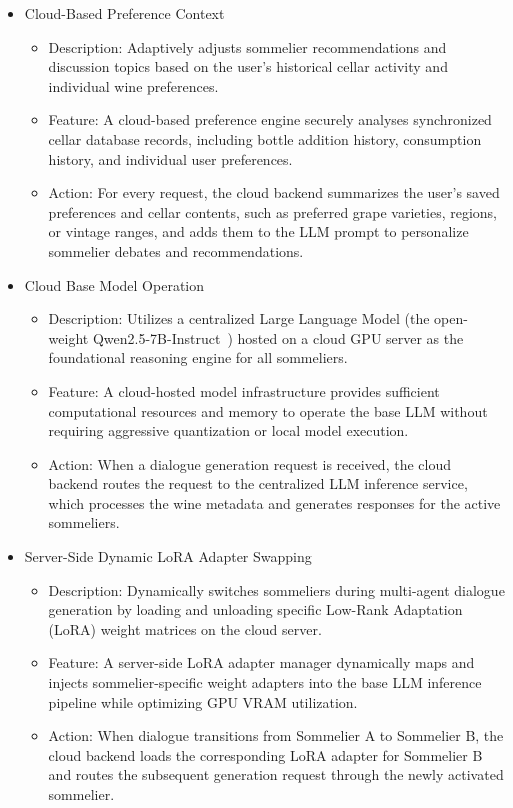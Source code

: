 \documentclass[conference]{IEEEtran}
\begin{document}
\begin{itemize}
    \item Cloud-Based Preference Context
    \begin{itemize}
        \item Description: Adaptively adjusts sommelier recommendations and discussion topics based on the user's historical cellar activity and individual wine preferences.
        \item Feature: A cloud-based preference engine securely analyses synchronized cellar database records, including bottle addition history, consumption history, and individual user preferences.
        \item Action: For every request, the cloud backend summarizes the user's saved preferences and cellar contents, such as preferred grape varieties, regions, or vintage ranges, and adds them to the LLM prompt to personalize sommelier debates and recommendations.
    \end{itemize}

    \item Cloud Base Model Operation
    \begin{itemize}
        \item Description: Utilizes a centralized Large Language Model (the open-weight Qwen2.5-7B-Instruct~\cite{qwen25}) hosted on a cloud GPU server as the foundational reasoning engine for all sommeliers.
        \item Feature: A cloud-hosted model infrastructure provides sufficient computational resources and memory to operate the base LLM without requiring aggressive quantization or local model execution.
        \item Action: When a dialogue generation request is received, the cloud backend routes the request to the centralized LLM inference service, which processes the wine metadata and generates responses for the active sommeliers.
    \end{itemize}

    \item Server-Side Dynamic LoRA Adapter Swapping
    \begin{itemize}
        \item Description: Dynamically switches sommeliers during multi-agent dialogue generation by loading and unloading specific Low-Rank Adaptation (LoRA) weight matrices on the cloud server.
        \item Feature: A server-side LoRA adapter manager dynamically maps and injects sommelier-specific weight adapters into the base LLM inference pipeline while optimizing GPU VRAM utilization.
        \item Action: When dialogue transitions from Sommelier A to Sommelier B, the cloud backend loads the corresponding LoRA adapter for Sommelier B and routes the subsequent generation request through the newly activated sommelier.
    \end{itemize}


\end{itemize}
\end{document}
